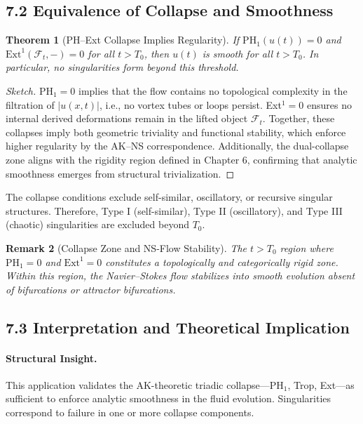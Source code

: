 \documentclass[11pt]{article}
\newtheorem{theorem}{Theorem}[section]
\newtheorem{remark}[theorem]{Remark}
\begin{document}
\subsection{7.2 Equivalence of Collapse and Smoothness}

\begin{theorem}[PH--Ext Collapse Implies Regularity]
If $\mathrm{PH}_1(u(t)) = 0$ and $\mathrm{Ext}^1(\mathcal{F}_t, -) = 0$ for all $t > T_0$, then $u(t)$ is smooth for all $t > T_0$. In particular, no singularities form beyond this threshold.
\end{theorem}

\begin{proof}[Sketch]
PH$_1 = 0$ implies that the flow contains no topological complexity in the filtration of $|u(x,t)|$, i.e., no vortex tubes or loops persist. Ext$^1 = 0$ ensures no internal derived deformations remain in the lifted object $\mathcal{F}_t$. Together, these collapses imply both geometric triviality and functional stability, which enforce higher regularity by the AK–NS correspondence. Additionally, the dual-collapse zone aligns with the rigidity region defined in Chapter 6, confirming that analytic smoothness emerges from structural trivialization.
\end{proof}

\begin{corollary}
The collapse conditions exclude self-similar, oscillatory, or recursive singular structures. Therefore, Type I (self-similar), Type II (oscillatory), and Type III (chaotic) singularities are excluded beyond $T_0$.
\end{corollary}

\begin{remark}[Collapse Zone and NS-Flow Stability]
The $t > T_0$ region where $\mathrm{PH}_1 = 0$ and $\mathrm{Ext}^1 = 0$ constitutes a topologically and categorically rigid zone. Within this region, the Navier--Stokes flow stabilizes into smooth evolution absent of bifurcations or attractor bifurcations.
\end{remark}

\subsection{7.3 Interpretation and Theoretical Implication}

\paragraph{Structural Insight.}
This application validates the AK-theoretic triadic collapse—PH$_1$, Trop, Ext—as sufficient to enforce analytic smoothness in the fluid evolution. Singularities correspond to failure in one or more collapse components.
\end{document}
